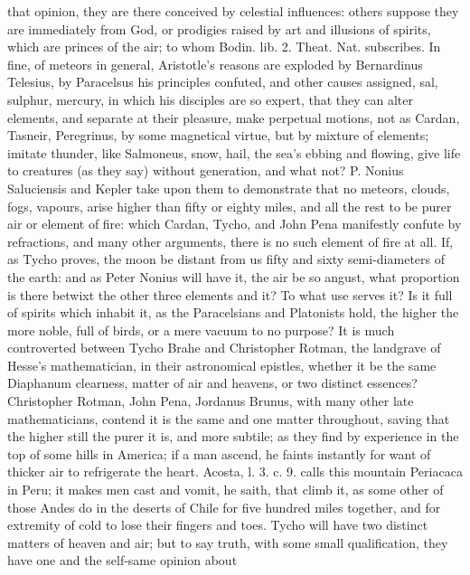 {that opinion, they are there conceived by celestial influences: others
suppose they are immediately from God, or prodigies raised by art and
illusions of spirits, which are princes of the air; to whom Bodin. lib.
2. Theat. Nat. subscribes. In fine, of meteors in general, Aristotle's
reasons are exploded by Bernardinus Telesius, by Paracelsus his
principles confuted, and other causes assigned, sal, sulphur, mercury,
in which his disciples are so expert, that they can alter elements, and
separate at their pleasure, make perpetual motions, not as Cardan,
Tasneir, Peregrinus, by some magnetical virtue, but by mixture of
elements; imitate thunder, like Salmoneus, snow, hail, the sea's ebbing
and flowing, give life to creatures (as they say) without generation,
and what not? P. Nonius Saluciensis and Kepler take upon them to
demonstrate that no meteors, clouds, fogs, vapours, arise higher
than fifty or eighty miles, and all the rest to be purer air or element
of fire: which Cardan, Tycho, and John Pena
manifestly confute by refractions, and many other arguments, there is
no such element of fire at all. If, as Tycho proves, the moon be
distant from us fifty and sixty semi-diameters of the earth: and as
Peter Nonius will have it, the air be so angust, what proportion is
there betwixt the other three elements and it? To what use serves it?
Is it full of spirits which inhabit it, as the Paracelsians and
Platonists hold, the higher the more noble, full of birds, or a
mere vacuum to no purpose? It is much controverted between Tycho Brahe
and Christopher Rotman, the landgrave of Hesse's mathematician, in
their astronomical epistles, whether it be the same Diaphanum
clearness, matter of air and heavens, or two distinct essences?
Christopher Rotman, John Pena, Jordanus Brunus, with many other late
mathematicians, contend it is the same and one matter throughout,
saving that the higher still the purer it is, and more subtile; as they
find by experience in the top of some hills in America; if a man
ascend, he faints instantly for want of thicker air to refrigerate the
heart. Acosta, l. 3. c. 9. calls this mountain Periacaca in Peru; it
makes men cast and vomit, he saith, that climb it, as some other of
those Andes do in the deserts of Chile for five hundred miles together,
and for extremity of cold to lose their fingers and toes. Tycho will
have two distinct matters of heaven and air; but to say truth, with
some small qualification, they have one and the self-same opinion about
}
